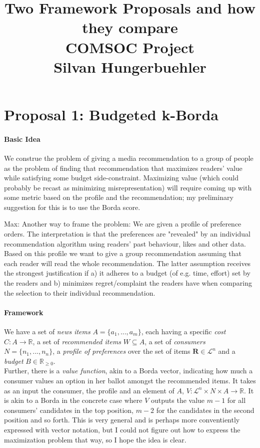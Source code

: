 \documentclass[10pt,a4paper]{article}
\title{
  Two Framework Proposals and how they compare\\ \large COMSOC Project
\\
  \large Silvan Hungerbuehler}
\date{}
\begin{document}
\maketitle
\section{Proposal 1: Budgeted k-Borda}
\paragraph{Basic Idea}
We construe the problem of giving a media recommendation to a group of people as the problem of finding that recommendation that maximizes readers' value while satisfying some budget side-constraint. Maximizing value (which could probably be recast as minimizing misrepresentation) will require coming up with some metric based on the profile and the recommendation; my preliminary suggestion for this is to use the Borda score.

Max: Another way to frame the problem: We are given a profile of preference orders. The interpretation is that the preferences
are "revealed" by an individual recommendation algorithm using readers' past behaviour, likes and other data. Based on this profile we want to give a group recommendation assuming that each reader will read the whole recommendation. The latter assumption receives the strongest justification if a) it adheres to a budget (of e.g. time, effort) set by the readers and b) minimizes regret/complaint the readers have when comparing the selection to their individual recommendation.

\paragraph{Framework}
We have a set of \emph{news items} $A=\{a_1,...,a_m\}$, each having a specific \emph{cost} $C: A\rightarrow \mathbb{R}$, a set of \emph{recommended items} $W\subseteq A$, a set of \emph{consumers} $N=\{n_1,...,n_n\}$, a \emph{profile of preferences} over the set of items $\mathbf{R}\in \mathcal{L}^n$ and a \emph{budget} $B\in \mathbb{R}_{\geq 0}$.\\
Further, there is a \emph{value function}, akin to a Borda vector, indicating how much a consumer values an option in her ballot amongst the recommended items. It takes as an input the consumer, the profile and an element of $A$,  $V: \mathcal{L}^n \times N \times  A \rightarrow \mathbb{R}$. It is akin to a Borda in the concrete case where $V$ outputs the value $m-1$ for all consumers' candidates in the top position, $m-2$ for the candidates in the second position and so forth. This is very general and is perhaps more conventiently expressed with vector notation, but I could not figure out how to express the maximization problem that way, so I hope the idea is clear.\\
\end{document}
